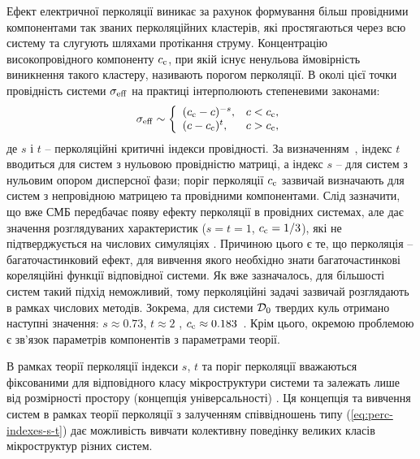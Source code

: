 \documentclass[14pt,twoside]{vakthesis}
\begin{document}
Ефект електричної перколяції виникає за рахунок формування більш провідними компонентами так званих перколяційних кластерів, які простягаються через всю систему та слугують шляхами протікання струму.
Концентрацію високопровідного компоненту $c_{\rm c}$, при якій існує ненульова ймовірність виникнення такого кластеру, називають порогом перколяції. В околі цієї точки провідність системи $\sigma_{\rm eff}$ на практиці інтерполюють степеневими законами:
\begin{equation}\label{eq:perc-indexes-s-t}
\sigma_{\rm eff} \sim \left\{ 
\begin{array}{ll}
(c_{\rm c} - c)^{-s}, & c< c_{\rm c},\\
(c - c_{\rm c})^t, & c> c_{\rm c},
\end{array}
\right.
\end{equation}
де $s$ і $t$ -- перколяційні критичні індекси провідності. За визначенням~\cite{Aharony,Torquato,Sahimi,Hunt}, індекс $t$ вводиться для систем з нульовою провідністю матриці, а індекс $s$ -- для систем з нульовим опором дисперсної фази; поріг перколяції $c_{\rm c}$ зазвичай визначають для систем з непровідною матрицею та провідними компонентами. Слід зазначити, що вже СМБ передбачає появу ефекту перколяції в провідних системах, але дає  значення розглядуваних характеристик ($s=t=1$, $c_{\rm c}=1/3$), які не підтверджується на числових симуляціях \cite{Kirkpatrick1973,Torquato,Aharony}. Причиною цього є те, що перколяція -- багаточастинковий ефект, для вивчення якого необхідно знати багаточастинкові кореляційні функції відповідної системи. Як вже зазначалось, для більшості систем такий підхід неможливий, тому перколяційні задачі зазвичай розглядають в рамках числових методів. Зокрема, для системи ${\cal D}_0$ твердих куль отримано наступні значення: $s\approx 0.73$, $t\approx 2$ \cite{Aharony}, $c_{\rm c} \approx 0.183$~\cite{Powel1979}.
Крім цього, окремою проблемою є зв'язок параметрів компонентів з параметрами теорії.

В рамках теорії перколяції індекси $s$, $t$ та поріг перколяції вважаються фіксованими для відповідного класу мікроструктури системи та залежать лише від розмірності простору (концепція універсальності) \cite{Aharony,Torquato,Hunt}. 
Ця концепція та вивчення систем в рамках теорії перколяції з залученням співвідношень типу (\ref{eq:perc-indexes-s-t}) дає можливість вивчати колективну поведінку великих класів мікроструктур різних систем. 
\end{document}
